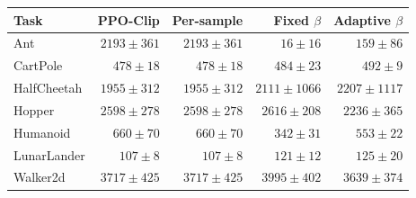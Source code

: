\begin{tabular}{l rrrr}
\toprule
Task & PPO-Clip & Per-sample & Fixed $\beta$ & Adaptive $\beta$ \\
\midrule
Ant & $2193 \pm 361$ & $2193 \pm 361$ & $16 \pm 16$ & $159 \pm 86$ \\
CartPole & $478 \pm 18$ & $478 \pm 18$ & $484 \pm 23$ & $492 \pm 9$ \\
HalfCheetah & $1955 \pm 312$ & $1955 \pm 312$ & $2111 \pm 1066$ & $2207 \pm 1117$ \\
Hopper & $2598 \pm 278$ & $2598 \pm 278$ & $2616 \pm 208$ & $2236 \pm 365$ \\
Humanoid & $660 \pm 70$ & $660 \pm 70$ & $342 \pm 31$ & $553 \pm 22$ \\
LunarLander & $107 \pm 8$ & $107 \pm 8$ & $121 \pm 12$ & $125 \pm 20$ \\
Walker2d & $3717 \pm 425$ & $3717 \pm 425$ & $3995 \pm 402$ & $3639 \pm 374$ \\
\bottomrule
\end{tabular}
